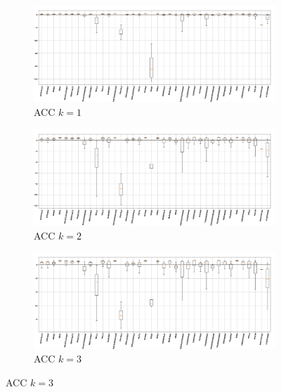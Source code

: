 \documentclass[12pt,letterpaper]{article}
\begin{document}
\begin{figure}[H]
\begin{center}

	\begin{subfigure}{1.0\textwidth}
	\centering
	\includegraphics[width=\textwidth , height=0.2\textheight]
		{../FiguresFeatures/Auto_Correlation_1}
	\caption{ACC $k=1$}
	\end{subfigure}
	
	\begin{subfigure}{1.0\textwidth}
	\centering
	\includegraphics[width=\textwidth , height=0.2\textheight]
		{../FiguresFeatures/Auto_Correlation_2}
	\caption{ACC $k=2$}
	\end{subfigure}
	
	\begin{subfigure}{1.0\textwidth}
	\centering
	\includegraphics[width=\textwidth , height=0.2\textheight]
		{../FiguresFeatures/Auto_Correlation_3}
	\caption{ACC $k=3$}
	\end{subfigure}
	

\end{center}
\end{figure}
\end{document}
